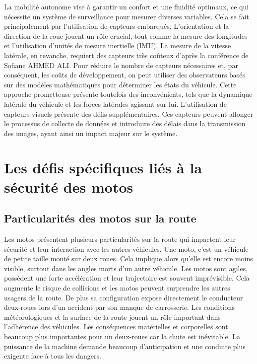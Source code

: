 \documentclass{article}
\begin{document}
La mobilité autonome vise à garantir un confort et une fluidité optimaux, ce qui nécessite un système de surveillance pour mesurer diverses variables. Cela se fait principalement par l'utilisation de capteurs embarqués.
L'orientation et la direction de la roue jouent un rôle crucial, tout comme la mesure des longitudes et l'utilisation d'unités de mesure inertielle (IMU). La mesure de la vitesse latérale, en revanche, requiert des capteurs très coûteux d'après la conférence\cite{ahmed_ali_synthese_2024} de Sofiane AHMED ALI.
Pour réduire le nombre de capteurs nécessaires et, par conséquent, les coûts de développement, on peut utiliser des observateurs basés sur des modèles mathématiques pour déterminer les états du véhicule. Cette approche prometteuse présente toutefois des inconvénients, tels que la dynamique latérale du véhicule et les forces latérales agissant sur lui.
L'utilisation de capteurs visuels présente des défis supplémentaires. Ces capteurs peuvent allonger le processus de collecte de données et introduire des délais dans la transmission des images, ayant ainsi un impact majeur sur le système.


\newpage
\section{Les défis spécifiques liés à la sécurité des motos}

\subsection{Particularités des motos sur la route}
Les motos présentent plusieurs particularités sur la route qui impactent leur sécurité et leur interaction avec les autres véhicules.
Une moto, c'est un véhicule de petite taille monté sur deux roues. Cela implique alors qu'elle est encore moins visible, surtout dans les angles morts d'un autre véhicule. Les motos sont agiles, possèdent une forte accélération et leur trajectoire est souvent imprévisible. Cela augmente le risque de collisions et les motos peuvent surprendre les autres usagers de la route. De plus sa configuration expose directement le conducteur deux-roues lors d'un accident par son manque de carrosserie. Les conditions météorologiques et la surface de la route jouent un rôle important dans l'adhérence des véhicules. Les conséquences matérielles et corporelles sont beaucoup plus importantes pour un deux-roues car la chute est inévitable.
La puissance de la machine demande beaucoup d'anticipation et une conduite plus exigente face à tous les dangers.
\end{document}
